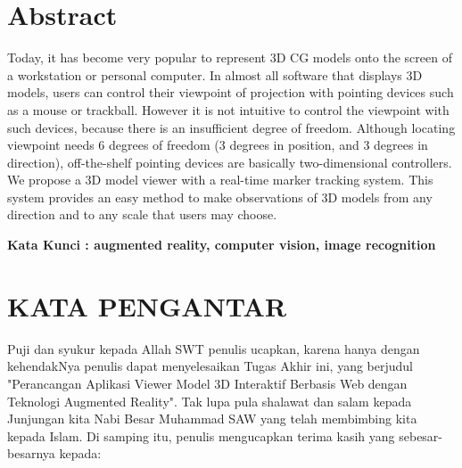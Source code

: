 \documentclass[12pt,a4paper,pdftex,final,oneside,titlepage]{book}
\begin{document}

\chapter*{\centering Abstract}
\thispagestyle{empty}
Today, it has become very popular to represent 3D CG models onto the screen of a workstation or personal computer. In almost all software that displays 3D models, users can control their viewpoint of projection with pointing devices such as a mouse or trackball. However it is not intuitive to control the viewpoint with such devices, because there is an insufficient degree of freedom. Although locating viewpoint needs 6 degrees of freedom (3 degrees in position, and 3 degrees in direction), off-the-shelf pointing devices are basically two-dimensional controllers. We propose a 3D model viewer with a real-time marker tracking system. This system provides an easy method to make observations of 3D models from any direction and to any scale that users may choose. 

\vspace*{2cm}

\textbf{Kata Kunci : augmented reality, computer vision, image recognition}

\chapter*{KATA PENGANTAR}

Puji dan syukur kepada Allah SWT penulis ucapkan, karena hanya dengan kehendakNya penulis dapat menyelesaikan Tugas Akhir ini, yang berjudul "Perancangan Aplikasi Viewer Model 3D Interaktif Berbasis Web dengan Teknologi Augmented Reality". Tak lupa pula shalawat dan salam kepada Junjungan kita Nabi Besar Muhammad SAW yang telah membimbing kita kepada Islam. Di samping itu, penulis mengucapkan terima kasih yang sebesar-besarnya kepada:
\end{document}
